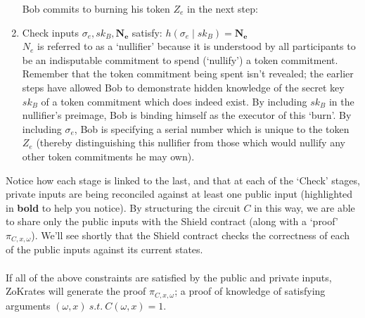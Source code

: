\begin{enumerate}
  Bob commits to burning his token $Z_e$ in the next step:
  \item Check inputs $\sigma_e, sk_B, \bm{N_e}$ satisfy:
    $h(\sigma_e\;|\;sk_B) = \bm{N_e}$\\
    $N_e$ is referred to as a `nullifier' because it is understood by all participants to be an indisputable commitment to spend (`nullify') a token commitment. Remember that the token commitment being spent isn't revealed; the earlier steps have allowed Bob to demonstrate hidden knowledge of the secret key $sk_B$ of a token commitment which does indeed exist. By including $sk_B$ in the nullifier's preimage, Bob is binding himself as the executor of this `burn'. By including $\sigma_e$, Bob is specifying a serial number which is unique to the token $Z_e$ (thereby distinguishing this nullifier from those which would nullify any other token commitments he may own).
\end{enumerate}
Notice how each stage is linked to the last, and that at each of the `Check' stages, private inputs are being reconciled against at least one public input (highlighted in \textbf{bold} to help you notice). By structuring the circuit $C$ in this way, we are able to share only the public inputs with the Shield contract (along with a `proof' $\pi_{C,x,\omega}$). We'll see shortly that the Shield contract checks the correctness of each of the public inputs against its current states.\\
\\

\noindent
If all of the above constraints are satisfied by the public and private inputs, ZoKrates will generate the proof $\pi_{C,x,\omega}$; a proof of knowledge of satisfying arguments $(\omega, x) \ s.t. \ C(\omega, x) = 1$.\\
\\







